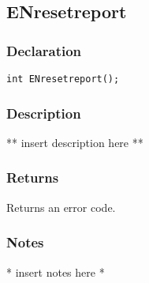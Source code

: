\subsection{ENresetreport}
\subsubsection{Declaration}
\begin{lstlisting}
int ENresetreport();
\end{lstlisting}
\subsubsection{Description}
** insert description here **
\subsubsection{Returns}
Returns an error code.
\subsubsection{Notes}
* insert notes here *
